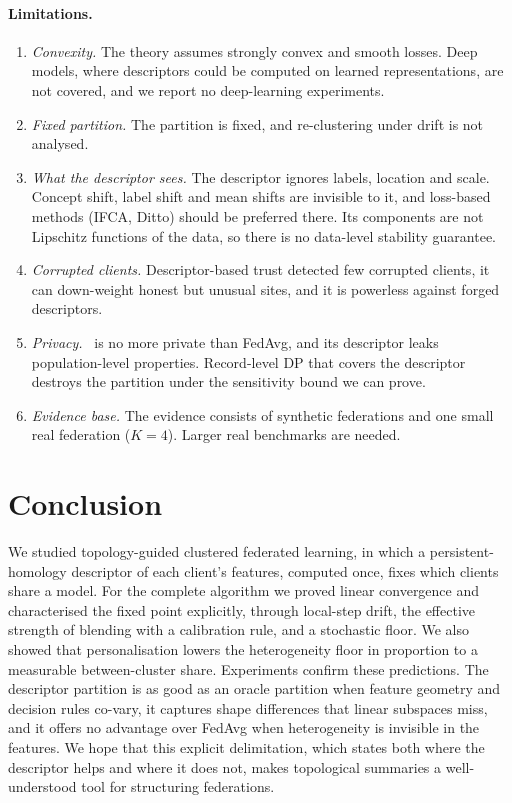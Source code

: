 \paragraph{Limitations.}
\begin{enumerate}[label=(\roman*),leftmargin=1.6em,itemsep=2pt]
  \item \emph{Convexity.} The theory assumes strongly convex and smooth losses. Deep models,
    where descriptors could be computed on learned representations, are not covered, and
    we report no deep-learning experiments.
  \item \emph{Fixed partition.} The partition is fixed, and re-clustering under drift is
    not analysed.
  \item \emph{What the descriptor sees.} The descriptor ignores labels, location and scale.
    Concept shift, label shift and mean shifts are invisible to it, and loss-based methods
    (IFCA, Ditto) should be preferred there. Its components are not Lipschitz functions of
    the data, so there is no data-level stability guarantee.
  \item \emph{Corrupted clients.} Descriptor-based trust detected few corrupted clients, it
    can down-weight honest but unusual sites, and it is powerless against forged
    descriptors.
  \item \emph{Privacy.} \ptopofl\ is no more private than FedAvg, and its descriptor leaks
    population-level properties. Record-level DP that covers the descriptor destroys the
    partition under the sensitivity bound we can prove.
  \item \emph{Evidence base.} The evidence consists of synthetic federations and one small
    real federation ($K=4$). Larger real benchmarks are needed.
\end{enumerate}

\section{Conclusion}
\label{sec:conclusion}

We studied topology-guided clustered federated learning, in which a persistent-homology
descriptor of each client's features, computed once, fixes which clients share a model. For
the complete algorithm we proved linear convergence and characterised the fixed point
explicitly, through local-step drift, the effective strength of blending with a calibration
rule, and a stochastic floor. We also showed that personalisation lowers the heterogeneity
floor in proportion to a measurable between-cluster share. Experiments confirm these
predictions. The descriptor partition is as good as an oracle partition when feature geometry
and decision rules co-vary, it captures shape differences that linear subspaces miss, and it
offers no advantage over FedAvg when heterogeneity is invisible in the features. We hope that
this explicit delimitation, which states both where the descriptor helps and where it does
not, makes topological summaries a well-understood tool for structuring federations.

